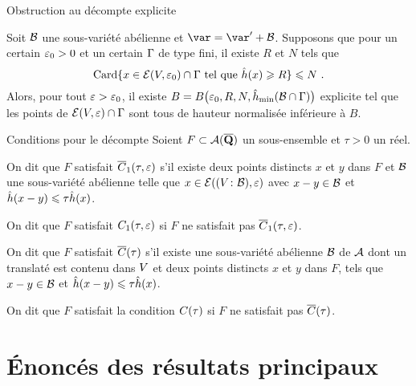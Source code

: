 \documentclass{mpg-thslides}
\begin{document}
\begin{frame}{Obstruction au décompte explicite}
  \begin{coro}
    Soit \( \mathcal B \) une sous-variété abélienne et \( \var = \var' + \vai \).
    Supposons que pour un certain \( \varepsilon_0 > 0 \) et un certain \( \Gamma \) de
    type fini, il existe \( R \) et \( N \) tels que
    \begin{equation}
      \operatorname{Card}
      \lbrace
        x \in \mathcal E(V, \varepsilon_0) \cap \Gamma
        \text{ tel que }
        \hat h (x) \geqslant R
      \rbrace
      \leqslant
      N
      \text{ .}
    \end{equation}
    Alors, pour tout \( \varepsilon > \varepsilon_0 \), il existe \( B = B\bigl(\varepsilon_0, R,
      N, \hat h_{\mathrm{min}}(\mathcal B \cap \Gamma)\bigr) \) explicite tel que les points de \(
      \mathcal E(V, \varepsilon) \cap \Gamma \) sont tous de hauteur normalisée
    inférieure à \( B \).
  \end{coro}
\end{frame}

\begin{frame}{Conditions pour le décompte}
  Soient \( F \subset \mathcal A(\overline{{\mathbf{Q}}}) \) un sous-ensemble et \( \tau > 0 \) un
  réel.
  \begin{tdef}
    On dit que \( F \) satisfait \( \condi*\tau\eps \) s'il existe deux points
    distincts \( x \) et \( y \) dans \( F \) et \( \mathcal B \) une sous-variété
    abélienne telle que \( x \in \mathcal E((V\colon\mathcal B), \varepsilon) \) avec \( x - y
      \in \mathcal B \) et \( \hat h ( x-y ) \leqslant \tau \hat h (x) \).

    On dit que \( F \) satisfait \( \condi\tau\eps \) si \( F \)
    ne satisfait pas \( \condi*\tau\eps \).
  \end{tdef}

  \begin{tdef}
    On dit que \( F \) satisfait \( \cond*\tau \) s'il existe une
    sous-variété abélienne \( \mathcal B \) de \( \mathcal A \) dont un translaté est contenu
    dans \( V \) et deux points distincts \( x \) et \( y \) dans \( F \),
    tels que \( x - y \in \mathcal B \) et \( \hat h ( x-y ) \leqslant \tau \hat h (x) \).

    On dit que \( F \) satisfait la condition \( \cond\tau \) si \( F \) ne
    satisfait pas \( \cond*\tau \).
  \end{tdef}
\end{frame}



\section[Résultats]{Énoncés des résultats principaux}
\tocsect
\end{document}
